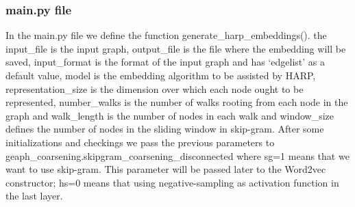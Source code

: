 \documentclass[a4paper,13pt]{article}
\begin{document}
\subsubsection{main.py file}
In the main.py file we define the function generate\_harp\_embeddings().
the input\_file is the input graph, output\_file is the file where the embedding will be saved, input\_format is the format of the input graph and has ‘edgelist’ as a default value, model is the embedding algorithm to  be assisted by HARP, representation\_size is the dimension over which each node ought to be represented, number\_walks is the number of walks rooting from each node in the graph and walk\_length is the number of nodes in each walk and window\_size defines the number of nodes in the sliding window in skip-gram.
After some initializations  and checkings we pass the previous parameters to geaph\_coarsening.skipgram\_coarsening\_disconnected
where sg=1 means that we want to use skip-gram. This parameter will be passed later to the Word2vec constructor;  hs=0 means that using negative-sampling as activation function in the last layer.
\end{document}
